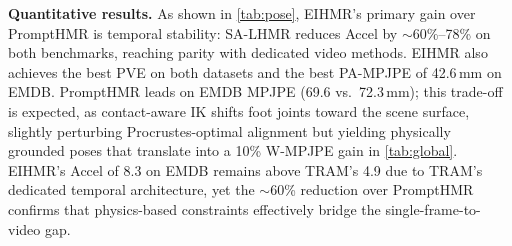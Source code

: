 \documentclass[runningheads]{llncs}
\begin{document}
\begin{table}[t]
  \caption{\textbf{Body pose evaluation on EMDB and 3DPW.} Parentheses denote the number of body joints. Accel in m/s$^2$, others in mm. Best in \textbf{bold}, second best \underline{underlined}.}
  \label{tab:pose}
  \centering
\end{table}

\noindent\textbf{Quantitative results.}
As shown in \cref{tab:pose}, EIHMR's primary gain over PromptHMR is temporal stability: SA-LHMR reduces Accel by ${\sim}$60\%--78\% on both benchmarks, reaching parity with dedicated video methods. EIHMR also achieves the best PVE on both datasets and the best PA-MPJPE of 42.6\,mm on EMDB. PromptHMR leads on EMDB MPJPE (69.6 vs.\ 72.3\,mm); this trade-off is expected, as contact-aware IK shifts foot joints toward the scene surface, slightly perturbing Procrustes-optimal alignment but yielding physically grounded poses that translate into a 10\% W-MPJPE gain in \cref{tab:global}. EIHMR's Accel of 8.3 on EMDB remains above TRAM's 4.9 due to TRAM's dedicated temporal architecture, yet the ${\sim}$60\% reduction over PromptHMR confirms that physics-based constraints effectively bridge the single-frame-to-video gap.
\end{document}

